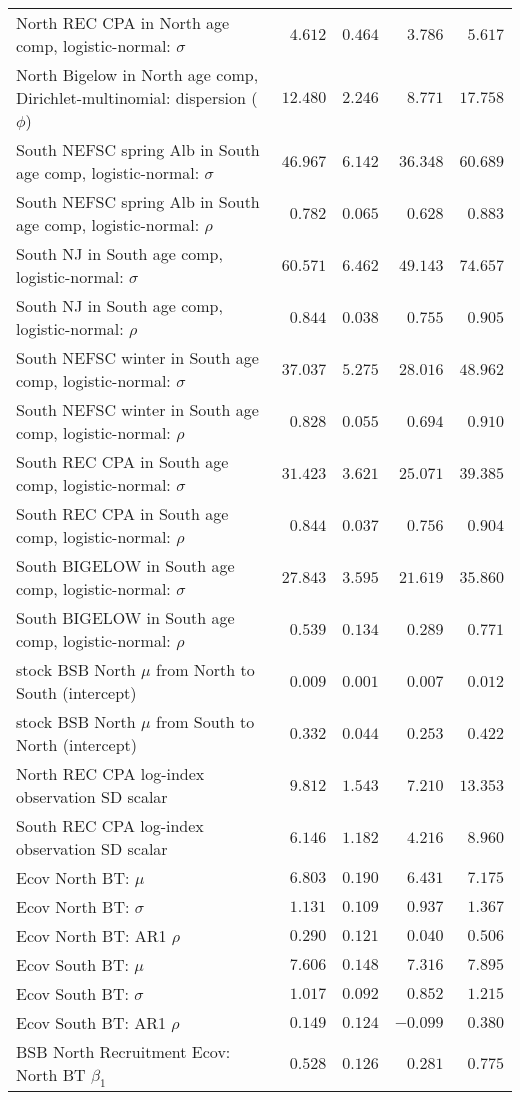 \documentclass[
]{article}
\begin{document}
\begin{landscape}
\begin{longtable}[t]{lrrrr}
North REC CPA in North age comp, logistic-normal: $\sigma$ & $4.612$ & $0.464$ & $3.786$ & $5.617$\\
North Bigelow in North age comp, Dirichlet-multinomial: dispersion ($\phi$) & $12.480$ & $2.246$ & $8.771$ & $17.758$\\
South NEFSC spring Alb in South age comp, logistic-normal: $\sigma$ & $46.967$ & $6.142$ & $36.348$ & $60.689$\\
\addlinespace
South NEFSC spring Alb in South age comp, logistic-normal: $\rho$ & $0.782$ & $0.065$ & $0.628$ & $0.883$\\
South NJ in South age comp, logistic-normal: $\sigma$ & $60.571$ & $6.462$ & $49.143$ & $74.657$\\
South NJ in South age comp, logistic-normal: $\rho$ & $0.844$ & $0.038$ & $0.755$ & $0.905$\\
South NEFSC winter in South age comp, logistic-normal: $\sigma$ & $37.037$ & $5.275$ & $28.016$ & $48.962$\\
South NEFSC winter in South age comp, logistic-normal: $\rho$ & $0.828$ & $0.055$ & $0.694$ & $0.910$\\
\addlinespace
South REC CPA in South age comp, logistic-normal: $\sigma$ & $31.423$ & $3.621$ & $25.071$ & $39.385$\\
South REC CPA in South age comp, logistic-normal: $\rho$ & $0.844$ & $0.037$ & $0.756$ & $0.904$\\
South BIGELOW in South age comp, logistic-normal: $\sigma$ & $27.843$ & $3.595$ & $21.619$ & $35.860$\\
South BIGELOW in South age comp, logistic-normal: $\rho$ & $0.539$ & $0.134$ & $0.289$ & $0.771$\\
stock BSB North $\mu$ from North to South (intercept) & $0.009$ & $0.001$ & $0.007$ & $0.012$\\
\addlinespace
stock BSB North $\mu$ from South to North (intercept) & $0.332$ & $0.044$ & $0.253$ & $0.422$\\
North REC CPA log-index observation SD scalar & $9.812$ & $1.543$ & $7.210$ & $13.353$\\
South REC CPA log-index observation SD scalar & $6.146$ & $1.182$ & $4.216$ & $8.960$\\
Ecov North BT: $\mu$ & $6.803$ & $0.190$ & $6.431$ & $7.175$\\
Ecov North BT: $\sigma$ & $1.131$ & $0.109$ & $0.937$ & $1.367$\\
\addlinespace
Ecov North BT: AR1 $\rho$ & $0.290$ & $0.121$ & $0.040$ & $0.506$\\
Ecov South BT: $\mu$ & $7.606$ & $0.148$ & $7.316$ & $7.895$\\
Ecov South BT: $\sigma$ & $1.017$ & $0.092$ & $0.852$ & $1.215$\\
Ecov South BT: AR1 $\rho$ & $0.149$ & $0.124$ & $-0.099$ & $0.380$\\
BSB North Recruitment Ecov: North BT $\beta_1$ & $0.528$ & $0.126$ & $0.281$ & $0.775$\\*
\end{longtable}
\end{landscape}
\end{document}
